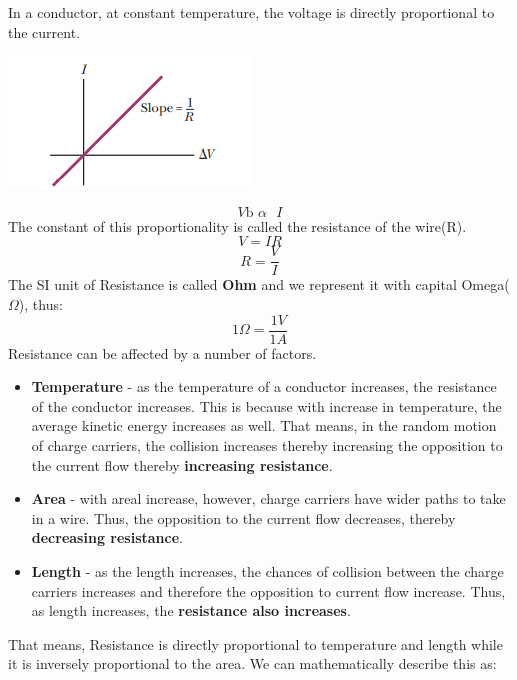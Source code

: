 \documentclass[9pt,addpoints]{exam}
\begin{document}
In a conductor, at constant temperature, the voltage is directly proportional to the current. 
\begin{center}
\includegraphics[scale=1]{iv_curve.png}
\end{center}
$$V\text{b  }\alpha\text{  }I$$
The constant of this proportionality is called the resistance of the wire(R).
$$V=IR$$ 
$$R=\frac{V}{I}$$
The SI unit of Resistance is called \textbf{Ohm} and we represent it with capital Omega($\varOmega$), thus:
$$1\varOmega = \frac{1 V}{1A}$$
Resistance can be affected by a number of factors.
\begin{itemize}
	\item \textbf{Temperature} - as the temperature of a conductor increases, the resistance of the conductor increases. This is because with increase in temperature, the average kinetic energy increases as well. That means, in the random motion of charge carriers, the collision increases thereby increasing the opposition to the current flow thereby \textbf{increasing resistance}.
	\item \textbf{Area} - with areal increase, however, charge carriers have wider paths to take in a wire. Thus, the opposition to the current flow decreases, thereby \textbf{decreasing resistance}.
	\item \textbf{Length} - as the length increases, the chances of collision between the charge carriers increases and therefore the opposition to current flow increase. Thus, as length increases, the \textbf{resistance also increases}.
\end{itemize}
That means, Resistance is directly proportional to temperature and length while it is inversely proportional to the area. We can mathematically describe this as:
\end{document}
